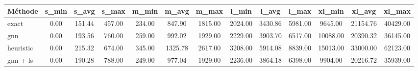 \begin{tabular}{lcccccccccccc}
\toprule
Méthode & s_min & s_avg & s_max & m_min & m_avg & m_max & l_min & l_avg & l_max & xl_min & xl_avg & xl_max \\
\midrule
exact & 0.00 & 151.44 & 457.00 & 234.00 & 847.90 & 1815.00 & 2024.00 & 3430.86 & 5981.00 & 9645.00 & 21154.76 & 40429.00 \\
gnn & 0.00 & 193.56 & 760.00 & 259.00 & 992.02 & 1929.00 & 2229.00 & 3903.70 & 6517.00 & 10088.00 & 20390.32 & 36145.00 \\
heuristic & 0.00 & 215.32 & 674.00 & 345.00 & 1325.78 & 2617.00 & 3208.00 & 5914.08 & 8839.00 & 15013.00 & 33000.00 & 62123.00 \\
gnn + ls & 0.00 & 190.28 & 788.00 & 249.00 & 977.04 & 1929.00 & 2236.00 & 3864.18 & 6398.00 & 9904.00 & 20216.72 & 35939.00 \\
\bottomrule
\end{tabular}
